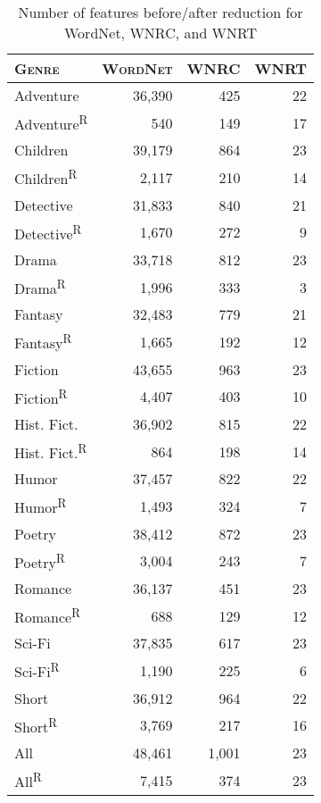 \begin{table}[t]
    \caption{Number of features before/after reduction for WordNet, WNRC, and WNRT}
    \label{tab:wn vs wnrc features}
    \begin{tabular}{l|r|r|r}
        \centering
        \textsc{Genre} & \textsc{WordNet} & \textsc{WNRC} & \textsc{WNRT} \\
        \hline
        Adventure & 36,390 & 425 & 22 \\
        Adventure\textsuperscript{R} & 540 & 149 & 17 \\
        \hline
        Children & 39,179 & 864 & 23 \\
        Children\textsuperscript{R} & 2,117 & 210 & 14 \\
        \hline
        Detective & 31,833 & 840 & 21 \\
        Detective\textsuperscript{R} & 1,670 & 272 & 9 \\
        \hline
        Drama & 33,718 & 812 & 23 \\
        Drama\textsuperscript{R} & 1,996 & 333 & 3 \\
        \hline
        Fantasy & 32,483 & 779 & 21 \\
        Fantasy\textsuperscript{R} & 1,665 & 192 & 12 \\
        \hline
        Fiction & 43,655 & 963 & 23 \\
        Fiction\textsuperscript{R} & 4,407 & 403 & 10 \\
        \hline
        Hist. Fict. & 36,902 & 815 & 22 \\
        Hist. Fict.\textsuperscript{R} & 864 & 198 & 14 \\
        \hline
        Humor & 37,457 & 822 & 22 \\
        Humor\textsuperscript{R} & 1,493 & 324 & 7 \\
        \hline
        Poetry & 38,412 & 872 & 23 \\
        Poetry\textsuperscript{R} & 3,004 & 243 & 7 \\
        \hline
        Romance & 36,137 & 451 & 23 \\
        Romance\textsuperscript{R} & 688 & 129 & 12 \\
        \hline
        Sci-Fi & 37,835 & 617 & 23 \\
        Sci-Fi\textsuperscript{R} & 1,190 & 225 & 6 \\
        \hline
        Short & 36,912 & 964 & 22 \\
        Short\textsuperscript{R} & 3,769 & 217 & 16 \\
        \hline
        All & 48,461 & 1,001 & 23 \\
        All\textsuperscript{R} & 7,415 & 374 & 23 \\
        \hline
    \end{tabular}
\end{table}